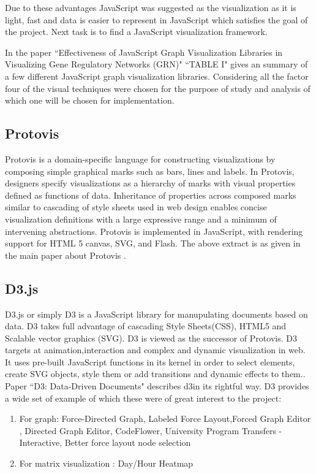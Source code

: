 Due to these advantages JavaScript was suggested as the visualization as it is light, fast and data is easier to represent in JavaScript which satisfies the goal of the project. Next task is to find a JavaScript visualization framework.  

\par In the paper ``Effectiveness of JavaScript Graph Visualization Libraries in Visualizing Gene Regulatory Networks (GRN)" \cite{graphjslib} ``TABLE I" gives an summary of a few different JavaScript graph visualization libraries. Considering all the factor four of the visual techniques were chosen for the purpose of study and analysis of which one will be chosen for implementation. 
\subsection{Protovis}
Protovis is a domain-specific
language for constructing visualizations by composing simple
graphical marks such as bars, lines and labels. In Protovis, designers
specify visualizations as a hierarchy of marks with visual properties
defined as functions of data. Inheritance of properties across
composed marks similar to cascading of style sheets used in web
design enables concise visualization definitions with a large expressive
range and a minimum of intervening abstractions. Protovis is implemented
in JavaScript, with rendering support for HTML 5 canvas,
SVG, and Flash. The above extract is as given in the main paper about Protovis
\cite{protovis}.

\subsection{D3.js}
D3.js or simply D3 is a JavaScript library for manupulating documents based on data. D3 takes full advantage of cascading Style Sheets(CSS), HTML5 and Scalable vector graphics (SVG). D3 is viewed as the successor of Protovis. D3 targets at animation,interaction and complex and dynamic visualization in web.  It uses pre-built JavaScript
functions in its kernel in order to select elements, create SVG
objects, style them or add transitions and dynamic effects to
them.\cite{graphjslib}. Paper ``D3: Data-Driven Documents" \cite{d3} describes d3in its rightful way. D3 provides a wide set of example of which these were of great interest to the project:
\begin{enumerate}
\item
For graph: Force-Directed Graph, Labeled Force Layout,Forced Graph Editor , Directed Graph Editor, CodeFlower, University Program Transfers - Interactive, Better force layout node selection
\item For matrix visualization : Day/Hour Heatmap
\end{enumerate}
